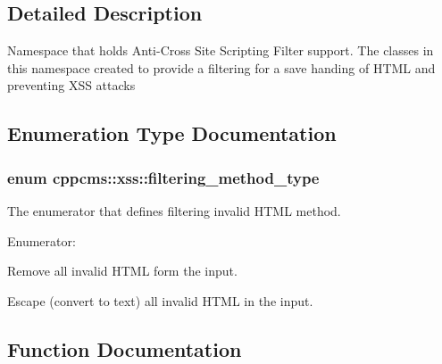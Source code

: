 \subsection{\-Detailed \-Description}
\-Namespace that holds \-Anti-\/\-Cross \-Site \-Scripting \-Filter support. \-The classes in this namespace created to provide a filtering for a save handing of \-H\-T\-M\-L and preventing \-X\-S\-S attacks 

\subsection{\-Enumeration \-Type \-Documentation}
\subsubsection[{filtering\-\_\-method\-\_\-type}]{\setlength{\rightskip}{0pt plus 5cm}enum {\bf cppcms\-::xss\-::filtering\-\_\-method\-\_\-type}}\label{namespacecppcms_1_1xss_a78682352617884a1eb716ebf2a62343d}


\-The enumerator that defines filtering invalid \-H\-T\-M\-L method. 

\begin{Desc}
\item[\-Enumerator\-: ]\par
\begin{description}
\item[{\em 
remove\-\_\-invalid\label{namespacecppcms_1_1xss_a78682352617884a1eb716ebf2a62343da5df42d96e38bf54cc8daa31ba8ab7e44}
}]\-Remove all invalid \-H\-T\-M\-L form the input. \item[{\em 
escape\-\_\-invalid\label{namespacecppcms_1_1xss_a78682352617884a1eb716ebf2a62343dae660331d92070806a4a0bd20ebeee94f}
}]\-Escape (convert to text) all invalid \-H\-T\-M\-L in the input. \end{description}
\end{Desc}



\subsection{\-Function \-Documentation}
